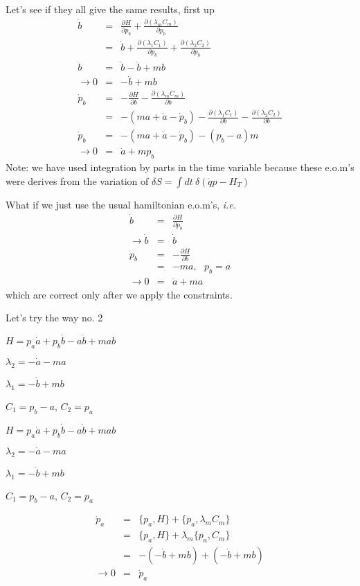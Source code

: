 \documentclass[aps,preprint,preprintnumbers,nofootinbib,showpacs,prd]{revtex4-1}
\newcommand{\ie}{{\it i.e.} }
\newcommand{\nbea}{\begin{eqnarray*}}
\newcommand{\neea}{\end{eqnarray*}}
\begin{document}
Let's see if they all give the same results, first up
%
\nbea
\dot b & = & \frac{\partial H}{\partial p_b} +  \frac{\partial (\lambda_m C_m)}{\partial p_b} \\
& = & \dot b + \frac{\partial (\lambda_1 C_1)}{\partial p_b} + \frac{\partial (\lambda_2 C_2)}{\partial p_b} \\
\dot b & = & \dot b - \dot b + mb \\
\to 0 & = & - \dot b + mb  \\
\dot p_b & = & - \frac{\partial H}{\partial b} - \frac{\partial (\lambda_m C_m)}{\partial b} \\
& = & -(ma + \dot a - \dot p_b) - \frac{\partial (\lambda_1 C_1)}{\partial b} - \frac{\partial (\lambda_2 C_2)}{\partial b} \\
\dot p_b & = & -(ma + \dot a - \dot p_b) - (p_b - a)m \\
\to 0 & = & \dot a + mp_b
\neea
%
Note: we have used integration by parts in the time variable because these e.o.m's were derives from the variation of $\delta S = \int dt ~\delta (\dot q p - H_T)$

What if we just use the usual hamiltonian e.o.m's, \ie
%
\nbea
\dot b & = & \frac{\partial H}{\partial p_b}\\
\to \dot b & = & \dot b \\
\dot p_b & = & - \frac{\partial H}{\partial b}\\
& = & -ma, ~~~ p_b = a \\
\to 0 & = & \dot a + ma
\neea
%
which are correct only after we apply the constraints.

Let's try the way no. 2 


$H= p_a \dot a + p_b \dot b - a\dot b + m ab $

$\lambda_2 = -\dot a - ma$

$\lambda_1 = - \dot b + mb$

$C_1 = p_b - a$, $C_2 = p_a$


$H= p_a \dot a + p_b \dot b - a\dot b + m ab $

$\lambda_2 = -\dot a - ma$

$\lambda_1 = - \dot b + mb$

$C_1 = p_b - a$, $C_2 = p_a$


%
\nbea
\dot p_a & = & \{p_a, H\} + \{p_a, \lambda_m C_m\} \\
& = & \{p_a, H\} + \lambda_m \{p_a, C_m\} \\
& = & -(-\dot b + mb) + (-\dot b + mb) \\
\to 0 & = & \dot p_a
\neea
%
\end{document}
